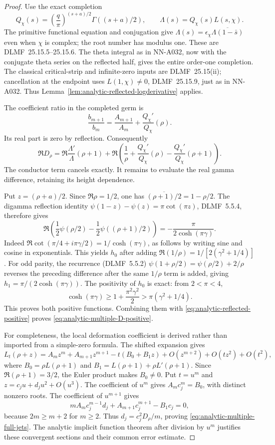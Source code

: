 \begin{proof}
Use the exact completion
\[
 Q_\chi(s)=\left(\frac q\pi\right)^{(s+a)/2}
                         \Gamma((s+a)/2),
 \qquad \Lambda(s)=Q_\chi(s)L(s,\chi).
\]
The primitive functional equation and conjugation give
$\Lambda(s)=\epsilon_\chi
\overline{\Lambda(1-\bar s)}$ even when $\chi$ is complex;
the root number has modulus one. These are DLMF~25.15.5--25.15.6.
The theta integral as in NN-A032, now with the conjugate theta
series on the reflected half, gives the entire order-one
completion. The classical critical-strip and infinite-zero
inputs are DLMF~25.15(ii); cancellation at the endpoint uses
$L(1,\chi)\ne0$, DLMF~25.15.9, just as in NN-A032.
Thus Lemma~\ref{lem:analytic-reflected-logderivative} applies.

The coefficient ratio in the completed germ is
\[
 \frac{b_{m+1}}{b_m}
          =\frac{A_{m+1}}{A_m}+\frac{Q_\chi'}{Q_\chi}(\rho).
\]
Its real part is zero by reflection. Consequently
\begin{equation}\label{eq:analytic-multiple-D-completed}
 \Re D_\rho=
 \Re\frac{\Lambda'}\Lambda(\rho+1)
 +\Re\left(\frac1\rho+
       \frac{Q_\chi'}{Q_\chi}(\rho)
       -\frac{Q_\chi'}{Q_\chi}(\rho+1)\right).
\end{equation}
The conductor term cancels exactly. It remains to evaluate
the real gamma difference, retaining its height dependence.

Put $z=(\rho+a)/2$. Since $\Re\rho=1/2$, one has
$\overline{(\rho+1)/2}=1-\rho/2$. The digamma reflection
identity $\psi(1-z)-\psi(z)=\pi\cot(\pi z)$, DLMF~5.5.4,
therefore gives
\[
 \Re\left(\frac12\psi(\rho/2)
                   -\frac12\psi((\rho+1)/2)\right)
             =-\frac{\pi}{2\cosh(\pi\gamma)}.
\]
Indeed $\Re\cot(\pi/4+i\pi\gamma/2)=1/\cosh(\pi\gamma)$,
as follows by writing sine and cosine in exponentials.
This yields $h_0$ after adding
$\Re(1/\rho)=1/[2(\gamma^2+1/4)]$.
For odd parity, the recurrence (DLMF~5.5.2)
$\psi(1+\rho/2)=\psi(\rho/2)+2/\rho$ reverses the preceding
difference after the same $1/\rho$ term is added, giving
$h_1=\pi/(2\cosh(\pi\gamma))$.
The positivity of $h_0$ is exact: from $2<\pi<4$,
\[
 \cosh(\pi\gamma)\ge1+\frac{\pi^2\gamma^2}{2}
              >\pi(\gamma^2+1/4).
\]
This proves both positive functions. Combining them with
\eqref{eq:analytic-reflected-positive} proves
\eqref{eq:analytic-multiple-D-positive}.

For completeness, the local deformation coefficient is
derived rather than imported from a simple-zero formula.
The shifted expansion gives
\[
 L_t(\rho+z)=A_mz^m+A_{m+1}z^{m+1}
       -t(B_0+B_1z)+O(z^{m+2})+O(tz^2)+O(t^2),
\]
where $B_0=\rho L(\rho+1)$ and
$B_1=L(\rho+1)+\rho L'(\rho+1)$. Since $\Re(\rho+1)=3/2$,
the Euler product makes $B_0\ne0$. Put $t=u^m$ and
$z=c_ju+d_ju^2+O(u^3)$. The coefficient of $u^m$ gives
$A_mc_j^m=B_0$, with distinct nonzero roots. The coefficient
of $u^{m+1}$ gives
\[
 mA_mc_j^{m-1}d_j+A_{m+1}c_j^{m+1}-B_1c_j=0,
\]
because $2m\ge m+2$ for $m\ge2$. Thus
$d_j=c_j^2D_\rho/m$, proving
\eqref{eq:analytic-multiple-full-jets}. The analytic implicit
function theorem after division by $u^m$ justifies these
convergent sections and their common error estimate.


\end{proof}
